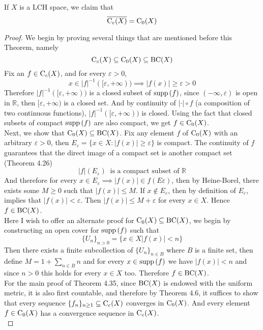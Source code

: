 \documentclass[../../main.tex]{subfiles}
\begin{document}
\begin{wts}
If $X$ is a LCH space, we claim that
\[
\overline{\operatorname{C}_c({X})}=\operatorname{C}_0({X})
\]
\end{wts}
\begin{proof}
We begin by proving several things that are mentioned before this Theorem, namely
\[
\operatorname{C}_c({X})\subseteq\operatorname{C}_0({X})\subseteq\operatorname{BC}({X})
\]
Fix an $f\in \operatorname{C}_c({X})$, and for every $\varepsilon>0$, 
\[
x\in|f|^{-1}([\varepsilon,+\infty))\implies |f(x)|\geq\varepsilon>0
\]
Therefore $|f|^{-1}([\varepsilon,+\infty))$ is a closed subset of $\operatorname{supp}{(f)}$, since $(-\infty,\varepsilon)$ is open in $\mathbb{R}$, then $[\varepsilon,+\infty)$ is a closed set. And by continuity of $|\cdot|\circ f$ (a composition of two continuous functions), $|f|^{-1}([\varepsilon,+\infty))$ is closed. Using the fact that closed subsets of compact $\operatorname{supp}{(f)}$ are also compact, we get $f\in \operatorname{C}_0({X})$.\\

Next, we show that $\operatorname{C}_0({X})\subseteq \operatorname{BC}({X})$. Fix any element $f$ of $\operatorname{C}_0({X})$ with an arbitrary $\varepsilon>0$, then $E_\varepsilon = \{x\in X:|f(x)|\geq \varepsilon\}$ is compact. The continuity of $f$ guarantees that the direct image of a compact set is another compact set (Theorem 4.26)
\[
|f|(E_\varepsilon)\:\text{ is a compact subset of }\mathbb{R}
\]
And therefore for every $x\in E_\varepsilon\implies |f(x)|\in f(E\varepsilon)$, then by Heine-Borel, there exists some $M\geq 0$ such that $|f(x)|\leq M$. If $x\notin E_\varepsilon$, then by definition of $E_\varepsilon$, implies that $|f(x)|< \varepsilon$. Then $|f(x)|\leq M+\varepsilon$ for every $x\in X$. Hence $f\in\operatorname{BC}({X})$.\\

Here I wish to offer an alternate proof for $\operatorname{C}_0({X})\subseteq\operatorname{BC}({X})$, we begin by constructing an open cover for $\operatorname{supp}{(f)}$ such that
\[
\{U_n\}_{n>0} = \{x\in X |f(x)|<n\}
\]
Then there exists a finite subcollection of $\{U_n\}_{n\in B}$ where $B$ is a finite set, then define $M = 1+\sum_{n\in B}n$ and for every $x\in \operatorname{supp}{(f)}$ we have $|f(x)|<n$ and since $n>0$ this holds for every $x\in X$ too. Therefore $f\in \operatorname{BC}({X})$.\\

For the main proof of Theorem 4.35, since $\operatorname{BC}({X})$ is endowed with the uniform metric, it is also first countable, and therefore by Theorem 4.6, it suffices to show that every sequence $\{f_n\}_{n\geq 1}\subseteq \operatorname{C}_c({X})$ converges in $\operatorname{C}_0({X})$. And every element $f\in \operatorname{C}_0({X})$ has a convergence sequence in $\operatorname{C}_c({X})$.\\


\end{proof}
\end{document}
